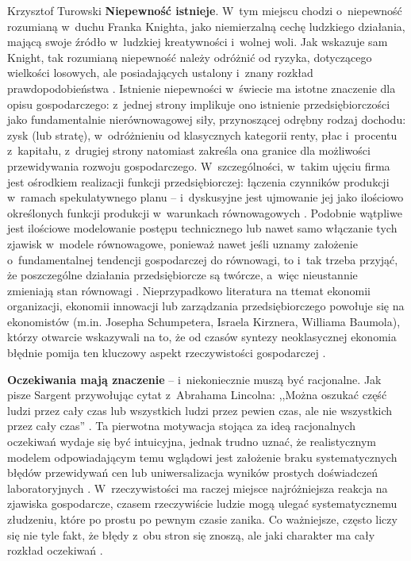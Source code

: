 \begin{artplenv}{Krzysztof Turowski}
\textbf{Niepewność istnieje}. W~tym miejscu chodzi o~niepewność rozumianą w~duchu Franka Knighta, jako niemierzalną
cechę ludzkiego działania, mającą swoje źródło w~ludzkiej kreatywności i~wolnej woli. Jak wskazuje sam Knight, tak
rozumianą niepewność należy odróżnić od ryzyka, dotyczącego wielkości losowych, ale posiadających ustalony i~znany
rozkład prawdopodobieństwa
\parencite{knight_risk_1921}.
Istnienie niepewności w~świecie ma istotne
znaczenie dla opisu gospodarczego: z~jednej strony implikuje ono istnienie przedsiębiorczości jako fundamentalnie
nierównowagowej siły, przynoszącej odrębny rodzaj dochodu: zysk (lub stratę), w~odróżnieniu od klasycznych kategorii
renty, płac i~procentu z~kapitału, z~drugiej strony natomiast zakreśla ona granice dla możliwości przewidywania rozwoju
gospodarczego. W~szczególności, w~takim ujęciu firma jest ośrodkiem realizacji funkcji przedsiębiorczej: łączenia
czynników produkcji w~ramach spekulatywnego planu  --  i~dyskusyjne jest ujmowanie jej jako ilościowo określonych
funkcji produkcji w~warunkach równowagowych
\parencite{baumol_entrepreneurship_1968}.
Podobnie wątpliwe jest ilościowe
modelowanie postępu technicznego lub nawet samo włączanie tych zjawisk w~modele równowagowe, ponieważ nawet jeśli
uznamy założenie o~fundamentalnej tendencji gospodarczej do równowagi, to i~tak trzeba przyjąć, że poszczególne
działania przedsiębiorcze są twórcze, a~więc nieustannie zmieniają stan równowagi
\parencite{schumpeter_creative_1947}.
Nieprzypadkowo literatura na ttemat ekonomii organizacji, ekonomii innowacji lub zarządzania przedsiębiorczego
powołuje się na ekonomistów (m.in. Josepha Schumpetera, Israela Kirznera, Williama Baumola), którzy otwarcie wskazywali
na to, że od czasów syntezy neoklasycznej ekonomia błędnie pomija ten kluczowy aspekt rzeczywistości gospodarczej
\parencite{foss_organizing_2012}.

\textbf{Oczekiwania mają znaczenie}  --  i~niekoniecznie muszą być racjonalne. Jak pisze Sargent przywołując cytat
z~Abrahama Lincolna: ,,Można oszukać część ludzi przez cały czas lub wszystkich ludzi przez pewien czas, ale nie
wszystkich przez cały czas''
\parencite{henderson_rational_2008}.
Ta pierwotna motywacja stojąca za ideą
racjonalnych oczekiwań wydaje się być intuicyjna, jednak trudno uznać, że realistycznym modelem odpowiadającym temu
wglądowi jest założenie braku systematycznych błędów przewidywań cen lub uniwersalizacja wyników prostych doświadczeń
laboratoryjnych
\parencite{colander_financial_2009}.
W~rzeczywistości ma raczej miejsce najróżniejsza
reakcja na zjawiska gospodarcze, czasem rzeczywiście ludzie mogą ulegać systematycznemu złudzeniu, które po prostu po
pewnym czasie zanika. Co ważniejsze, często liczy się nie tyle fakt, że błędy z~obu stron się znoszą, ale jaki
charakter ma cały rozkład oczekiwań
\parencite{lachmann_macro-economic_1973}.


\end{artplenv}
